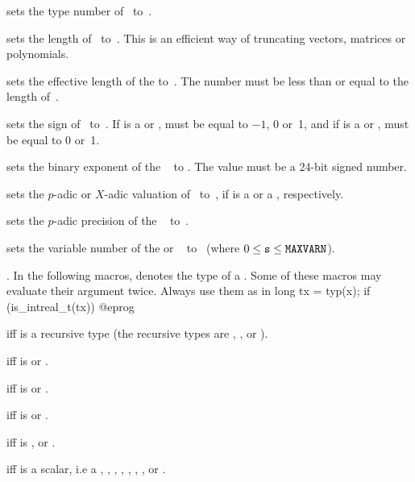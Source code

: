  sets the type number of~ to~.

 sets the length of~ to~. This
is an efficient way of truncating vectors, matrices or polynomials.

 sets the effective length
of the   to~. The number  must be less than or
equal to the length of~.

 sets the sign of~ to~.
If  is a  or ,  must be equal to $-1$, 0
or~1, and if  is a  or ,  must be equal to 0
or~1.

 sets the binary exponent of the
~ to . The value  must be a 24-bit signed
number.

 sets the $p$-adic or $X$-adic valuation
of~ to~, if  is a  or a ,
respectively.

 sets the $p$-adic precision of the
~ to~.

 sets the variable number of the 
or ~ to~ (where $0\le {\tt s}\le{\tt MAXVARN}$).

\label{se:typegroup}.
In the following macros,  denotes the type of a .
Some of these macros may evaluate their argument twice. Always use them as in
\bprog
  long tx = typ(x);
  if (is_intreal_t(tx)) { }
@eprog

  iff  is a recursive
type (the recursive types are , ,  or
).

  iff  is 
or .

  iff  is 
or .

  iff  is 
or .

  iff  is , 
or .

  iff  is a scalar, i.e
a ,
,
,
,
,
,
,
or
.

